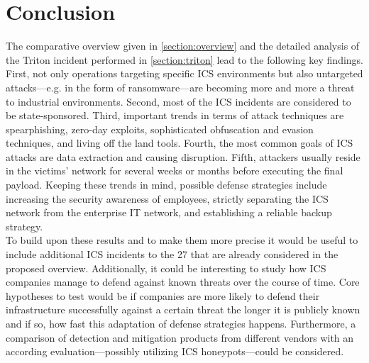 \documentclass[runningheads]{llncs}
\begin{document}
\section{Conclusion}
\label{section:conclusion}
The comparative overview given in \autoref{section:overview} and the detailed analysis of the Triton incident performed in \autoref{section:triton} lead to the following key findings.
First, not only operations targeting specific ICS environments but also untargeted attacks---e.g. in the form of ransomware---are becoming more and more a threat to industrial environments.
Second, most of the ICS incidents are considered to be state-sponsored.
Third, important trends in terms of attack techniques are spearphishing, zero-day exploits, sophisticated obfuscation and evasion techniques, and living off the land tools.
Fourth, the most common goals of ICS attacks are data extraction and causing disruption.
Fifth, attackers usually reside in the victims' network for several weeks or months before executing the final payload.
Keeping these trends in mind, possible defense strategies include increasing the security awareness of employees, strictly separating the ICS network from the enterprise IT network, and establishing a reliable backup strategy. \\
To build upon these results and to make them more precise it would be useful to include additional ICS incidents to the 27 that are already considered in the proposed overview.
Additionally, it could be interesting to study how ICS companies manage to defend against known threats over the course of time.
Core hypotheses to test would be if companies are more likely to defend their infrastructure successfully against a certain threat the longer it is publicly known and if so, how fast this adaptation of defense strategies happens.
Furthermore, a comparison of detection and mitigation products from different vendors with an according evaluation---possibly utilizing ICS honeypots---could be considered.


\newpage
%
%
%


\end{document}

